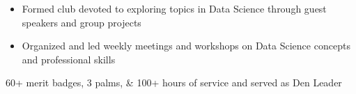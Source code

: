 \begin{cventries}
\begin{skills}
    {\vspace*{-2.5ex}
    \begin{itemize}[noitemsep, label=\bullet]
        \item Formed club devoted to exploring topics in Data Science through guest speakers and group projects
        \item Organized and led weekly meetings and workshops on Data Science concepts and professional skills
    \end{itemize}
    \vspace*{-3.5ex}}
    
    
    
    
    
    
    
    {60+ merit badges, 3 palms, \& 100+ hours of service and served as Den Leader}
\end{skills}
\end{cventries}

